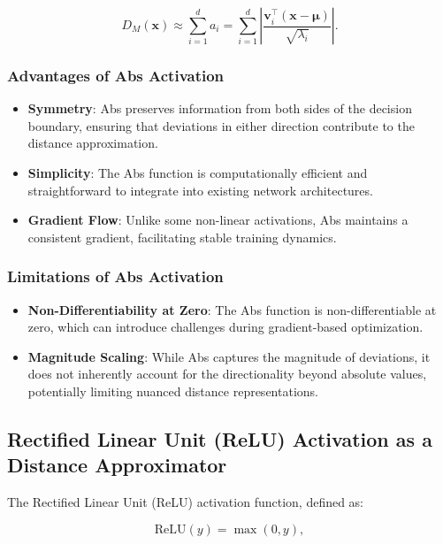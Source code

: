 \begin{equation}
D_M(\mathbf{x}) \approx \sum_{i=1}^d a_i = \sum_{i=1}^d \left| \frac{\mathbf{v}_i^\top (\mathbf{x} - \boldsymbol{\mu})}{\sqrt{\lambda_i}} \right|.
\end{equation}

\subsubsection{Advantages of Abs Activation}

\begin{itemize}
    \item \textbf{Symmetry}: Abs preserves information from both sides of the decision boundary, ensuring that deviations in either direction contribute to the distance approximation.
    \item \textbf{Simplicity}: The Abs function is computationally efficient and straightforward to integrate into existing network architectures.
    \item \textbf{Gradient Flow}: Unlike some non-linear activations, Abs maintains a consistent gradient, facilitating stable training dynamics.
\end{itemize}

\subsubsection{Limitations of Abs Activation}

\begin{itemize}
    \item \textbf{Non-Differentiability at Zero}: The Abs function is non-differentiable at zero, which can introduce challenges during gradient-based optimization.
    \item \textbf{Magnitude Scaling}: While Abs captures the magnitude of deviations, it does not inherently account for the directionality beyond absolute values, potentially limiting nuanced distance representations.
\end{itemize}

\subsection{Rectified Linear Unit (ReLU) Activation as a Distance Approximator}

The Rectified Linear Unit (ReLU) activation function, defined as:

\begin{equation}
\text{ReLU}(y) = \max(0, y),
\end{equation}

